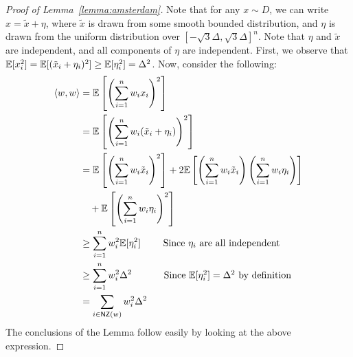 \begin{proof}[Proof of Lemma~\ref{lemma:amsterdam}] Note that for any $x \sim
D$, we can write $x = \tilde{x} + \eta$, where $\tilde{x}$ is drawn from some
smooth bounded distribution, and $\eta$ is drawn from the uniform distribution
over $[-\sqrt{3} \Delta, \sqrt{3} \Delta]^n$. Note that $\eta$ and $\tilde{x}$
are independent, and all components of $\eta$ are independent. First, we observe
that $\mathbb{E}[x_i^2] = \mathbb{E}[(\tilde{x}_i + \eta_i)^2] \geq \mathbb{E}[\eta_i^2] = \Delta^2$.
Now, consider the following:
\begin{align*}
\langle w, w \rangle &= \mathbb{E}\left[\left(\sum_{i=1}^n w_i x_i\right)^2\right] \\
&= \mathbb{E}\left[\left(\sum_{i = 1}^n w_i (\tilde{x}_i + \eta_i) \right)^2 \right] \\ 
&= \mathbb{E}\left[\left(\sum_{i=1}^n w_i \tilde{x}_i\right)^2\right] +
2\mathbb{E}\left[\left(\sum_{i=1}^n w_i \tilde{x}_i \right)\left(\sum_{i=1}^n w_i
\eta_i\right) \right] \\
\mbox{}&\quad + \mathbb{E}\left[\left(\sum_{i=1}^n w_i \eta_i\right)^2\right] \\
&\geq \sum_{i=1}^n w_i^2 \mathbb{E}[\eta_i^2] \mbox{~~~~~~~Since $\eta_i$ are all independent}
\\
&\geq \sum_{i = 1}^n w_i^2 \Delta^2  \mbox{~~~~~~~~~~Since $\mathbb{E}[\eta_i^2] = \Delta^2$ by
definition} \\
&= \sum_{i \in \mathsf{NZ}(w)} w_i^2 \Delta^2
\end{align*}
The conclusions of the Lemma follow easily by looking at the above expression.
\end{proof}
